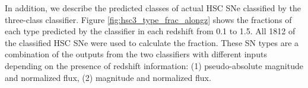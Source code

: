 \documentclass[proof]{pasj01}
\begin{document}
In addition, we describe the predicted classes of actual HSC SNe classified by the three-class classifier.
Figure \ref{fig:hsc3_type_frac_alongz} shows the fractions of each type predicted by the classifier in each redshift from 0.1 to 1.5.
All 1812 of the classified HSC SNe were used to calculate the fraction.
These SN types are a combination of the outputs from the two classifiers with different inputs depending on the presence of redshift information: (1) pseudo-absolute magnitude and normalized flux, (2) magnitude and normalized flux.

%
%
%
\end{document}

